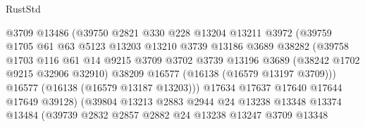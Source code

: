 \begin{lexlean}{RustStd}
\begin{coremodule}
                                @3709
                                @13486
                                (@39750
                                  @2821
                                  @330
                                  @228
                                  @13204
                                  @13211
                                  @3972
                                  (@39759
                                    @1705
                                    @61
                                    @63
                                    @5123
                                    @13203
                                    @13210
                                    @3739
                                    @13186
                                    @3689
                                    @38282
                                    (@39758
                                      @1703
                                      @116
                                      @61
                                      @14
                                      @9215
                                      @3709
                                      @3702
                                      @3739
                                      @13196
                                      @3689
                                      (@38242 @1702 @9215 @32906 @32910)
                                      @38209
                                      @16577
                                      (@16138 (@16579 @13197 @3709)))
                                    @16577
                                    (@16138 (@16579 @13187 @13203)))
                                  @17634
                                  @17637
                                  @17640
                                  @17644
                                  @17649
                                  @39128)
                                (@39804
                                  @13213
                                  @2883
                                  @2944
                                  @24
                                  @13238
                                  @13348
                                  @13374
                                  @13484
                                  (@39739
                                    @2832
                                    @2857
                                    @2882
                                    @24
                                    @13238
                                    @13247
                                    @3709
                                    @13348

\end{coremodule}
\end{lexlean}

